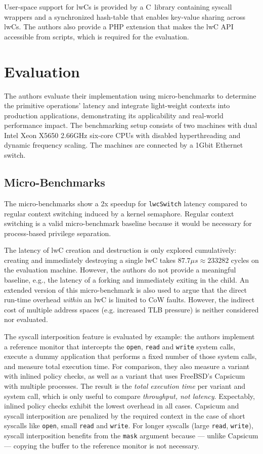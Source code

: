 \documentclass[10pt,twocolumn,a4paper]{article}
\begin{document}
User-space support for lwCs is provided by a C~library containing syscall wrappers and a synchronized hash-table that enables key-value sharing across lwCs.
The authors also provide a PHP extension that makes the lwC API accessible from scripts, which is required for the evaluation.

\section{Evaluation}\label{eval}
The authors evaluate their implementation using micro-benchmarks to determine the primitive operations' latency
and integrate light-weight contexts into production applications, demonstrating its applicability and real-world performance impact.
The benchmarking setup consists of two machines with dual Intel Xeon X5650 2.66GHz six-core CPUs with disabled hyperthreading and dynamic frequency scaling.
The machines are connected by a 1Gbit Ethernet switch.
\cite{lwcpaper}

\subsection{Micro-Benchmarks}
The micro-benchmarks show a 2x speedup for \lstinline{lwcSwitch} latency compared to regular context switching induced by a kernel semaphore.
Regular context switching is a valid micro-benchmark baseline because it would be necessary for process-based privilege separation.
\cite{lwcpaper}

The latency of lwC creation and destruction is only explored cumulatively: creating and immediately destroying a single lwC takes $87.7\mu s \approx 233282$ cycles on the evaluation machine. %
However, the authors do not provide a meaningful baseline, e.g., the latency of a forking and immediately exiting in the child.
An extended version of this micro-benchmark is also used to argue that the direct run-time overhead \textit{within} an lwC is limited to CoW faults.
However, the indirect cost of multiple address spaces (e.g. increased TLB pressure) is neither considered nor evaluated.
\cite{lwcpaper}

The syscall interposition feature is evaluated by example:
the authors implement a reference monitor that intercepts the \lstinline{open}, \lstinline{read} and \lstinline{write} system calls, execute a dummy application that performs a fixed number of those system calls, and measure total execution time.
For comparison, they also measure a variant with inlined policy checks, as well as a variant that uses FreeBSD's Capsicum with multiple processes.
The result is the \textit{total execution time} per variant and system call, which is only useful to compare \textit{throughput, not latency}.
Expectably, inlined policy checks exhibit the lowest overhead in all cases.
Capsicum and syscall interposition are penalized by the required context in the case of short syscalls like \lstinline{open}, small \lstinline{read} and \lstinline{write}.
For longer syscalls (large \lstinline{read}, \lstinline{write}), syscall interposition benefits from the \lstinline{mask} argument because --- unlike Capsicum --- copying the buffer to the reference monitor is not necessary.
\cite{lwcpaper}
\end{document}
